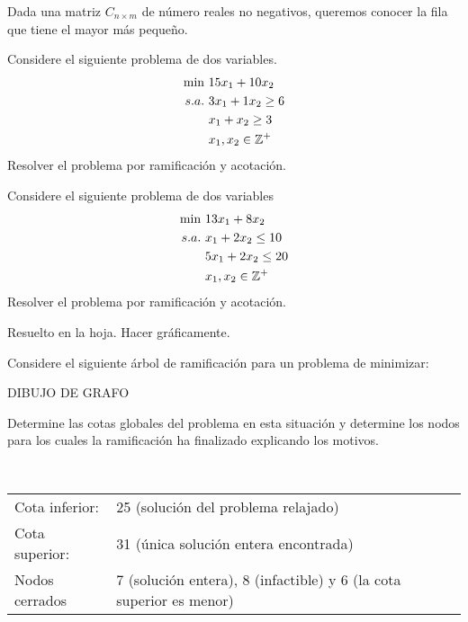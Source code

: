 \documentclass[twoside]{article}
\begin{document}
\newpage

\begin{ejercicio}{4}
Dada una matriz $C_{n\times m}$ de número reales no negativos, queremos conocer la fila que tiene el mayor más pequeño.
\end{ejercicio}
\begin{solucion}
\end{solucion}

\newpage

\begin{ejercicio}{5}
Considere el siguiente problema de dos variables.
\begin{align*}
\min\ & 15x_1+10x_2\\
s.a.\   & 3x_1+1x_2\geq 6\\
       & x_1+x_2\geq 3\\
       & x_1,x_2\in\mathbb{Z}^+
\end{align*}
Resolver el problema por ramificación y acotación.
\end{ejercicio}
\begin{solucion}
\end{solucion}

\newpage

\begin{ejercicio}{6}
Considere el siguiente problema de dos variables
\begin{align*}
\min\ & 13x_1+8x_2\\
s.a.\   & x_1+2x_2\leq 10\\
       & 5x_1+2x_2\leq 20\\
       & x_1,x_2\in\mathbb{Z}^+
\end{align*}
Resolver el problema por ramificación y acotación.
\end{ejercicio}
\begin{solucion}
Resuelto en la hoja. Hacer gráficamente.
\end{solucion}

\newpage

\begin{ejercicio}{7}
Considere el siguiente árbol de ramificación para un problema de minimizar:

DIBUJO DE GRAFO

Determine las cotas globales del problema en esta situación y determine los nodos para los cuales la ramificación ha finalizado explicando los motivos.
\end{ejercicio}
\begin{solucion}\

\begin{tabular}{l l}
Cota inferior: & 25 (solución del problema relajado) \\
Cota superior: & 31 (única solución entera encontrada) \\
Nodos cerrados & 7 (solución entera), 8 (infactible) y 6 (la cota superior es menor)
\end{tabular}
\end{solucion}
\end{document}
